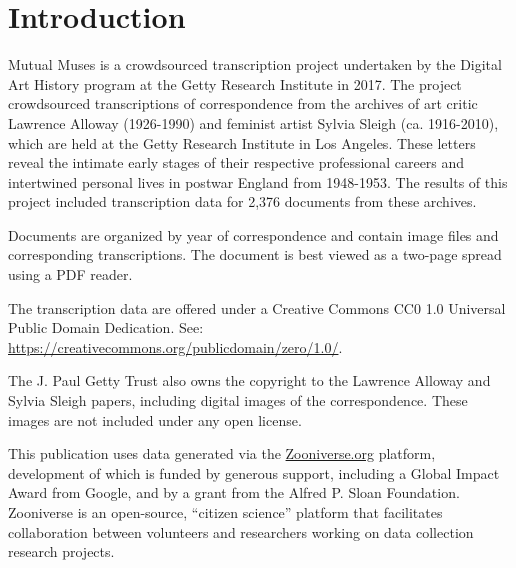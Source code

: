 \makeatletter
\renewcommand*\cleardoublepage{\clearpage\if@twoside
  \ifodd\c@page \hbox{}\newpage\if@twocolumn\hbox{}%
  \newpage\fi\fi\fi}
\makeatother

\chapter*{Introduction}

Mutual Muses is a crowdsourced transcription project undertaken by the Digital Art History program at the Getty Research Institute in 2017. The project crowdsourced transcriptions of correspondence from the archives of art critic Lawrence Alloway (1926-1990) and feminist artist Sylvia Sleigh (ca. 1916-2010), which are held at the Getty Research Institute in Los Angeles. These letters reveal the intimate early stages of their respective professional careers and intertwined personal lives in postwar England from 1948-1953. The results of this project included transcription data for 2,376 documents from these archives.

Documents are organized by year of correspondence and contain image files and corresponding transcriptions. The document is best viewed as a two-page spread using a PDF reader.

The transcription data are offered under a Creative Commons CC0 1.0 Universal Public Domain Dedication. See: \url{https://creativecommons.org/publicdomain/zero/1.0/}.

The J. Paul Getty Trust also owns the copyright to the Lawrence Alloway and Sylvia Sleigh papers, including digital images of the correspondence. These images are not included under any open license.

This publication uses data generated via the \href{https://www.zooniverse.org/}{Zooniverse.org} platform, development of which is funded by generous support, including a Global Impact Award from Google, and by a grant from the Alfred P. Sloan Foundation. Zooniverse is an open-source, ``citizen science'' platform that facilitates collaboration between volunteers and researchers working on data collection research projects.
